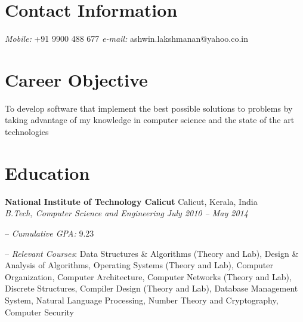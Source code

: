 \documentclass[margin,line]{resume}
\begin{document}


\begin{resume}

    \section{\mysidestyle Contact Information}
    
    
    \textit{Mobile:} +91 9900 488 677    \hfill    \textit{e-mail:} ashwin.lakshmanan@yahoo.co.in
        
      \vspace{+0.5mm}
	
	
    \section{\mysidestyle Career Objective}

        To develop software that implement the best possible solutions to problems by taking advantage of my knowledge in computer science and the state of the art technologies

										
    \section{\mysidestyle Education}

    \textbf{National Institute of Technology Calicut} \hfill Calicut, Kerala, India
    \\
    \textit{B.Tech, Computer Science and Engineering} \hfill \textit{ July 2010 -- May 2014}
    
    \begin{compactitem}
        \item[--] \textit{Cumulative GPA:} 9.23 
        \item[--] \textit{Relevant Courses}: Data Structures \& Algorithms (Theory and Lab), Design \& Analysis of Algorithms, Operating Systems (Theory and Lab), Computer Organization, Computer Architecture, Computer Networks (Theory and Lab), Discrete Structures, Compiler Design (Theory and Lab), Database Management System, Natural Language Processing, Number Theory and Cryptography, Computer Security
    \end{compactitem}
    

\end{resume}
\end{document}
